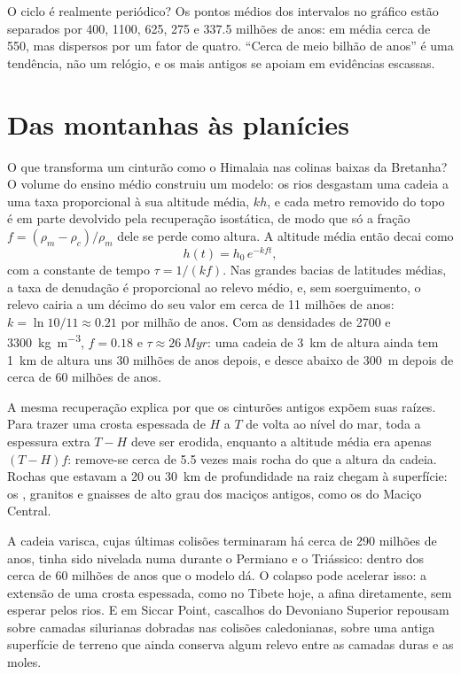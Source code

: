 O ciclo é realmente periódico? Os pontos médios dos intervalos no gráfico estão separados por 400,
1100, 625, 275 e 337.5 milhões de anos: em média cerca de 550, mas dispersos por um fator de
quatro. ``Cerca de meio bilhão de anos'' é uma tendência, não um relógio, e os 
mais antigos se apoiam em evidências escassas.

\section{Das montanhas às planícies}\label{sec:b2:wilson-cycle:erosion}

O que transforma um cinturão como o Himalaia nas colinas baixas da Bretanha? O volume do ensino médio
construiu um modelo: os rios desgastam uma cadeia a uma taxa proporcional à sua altitude média, $kh$,
e cada metro removido do topo é em parte devolvido pela recuperação isostática, de modo que só
a fração $f = (\rho_m - \rho_c)/\rho_m$ dele se perde como altura. A altitude média então
decai como
\[
  h(t) = h_0\,e^{-k f t} ,
\]
com a constante de tempo $\tau = 1/(kf)$. Nas grandes bacias de latitudes médias, a taxa de denudação é
proporcional ao relevo médio, e, sem soerguimento, o relevo cairia a um décimo do seu
valor em cerca de 11 milhões de anos: $k = \ln 10/11 \approx 0.21$ por milhão de anos. Com as
densidades de 2700 e \qty{3300}{kg.m^{-3}}, $f = 0.18$ e $\tau \approx \qty{26}{Myr}$: uma
cadeia de \qty{3}{km} de altura ainda tem \qty{1}{km} de altura uns 30 milhões de anos depois, e desce
abaixo de \qty{300}{m} depois de cerca de 60 milhões de anos.

A mesma recuperação explica por que os cinturões antigos expõem suas raízes. Para trazer uma crosta espessada de
$H$ a $T$ de volta ao nível do mar, toda a espessura extra $T - H$ deve ser erodida, enquanto a altitude
média era apenas $(T - H)f$: remove-se cerca de 5.5 vezes mais rocha do que a altura da
cadeia. Rochas que estavam a 20 ou \qty{30}{km} de profundidade na raiz chegam à superfície: os
, granitos e gnaisses de alto grau dos maciços antigos, como os do Maciço
Central.

A cadeia varisca, cujas últimas colisões terminaram há cerca de 290 milhões de anos, tinha sido
nivelada numa  durante o Permiano e o Triássico: dentro dos cerca de 60 milhões de anos
que o modelo dá. O colapso pode acelerar isso: a extensão de uma crosta espessada, como no
Tibete hoje, a afina diretamente, sem esperar pelos rios. E em Siccar Point, cascalhos do Devoniano Superior repousam sobre
camadas silurianas dobradas nas colisões caledonianas, sobre uma antiga superfície de terreno que ainda conserva
algum relevo entre as camadas duras e as moles.

